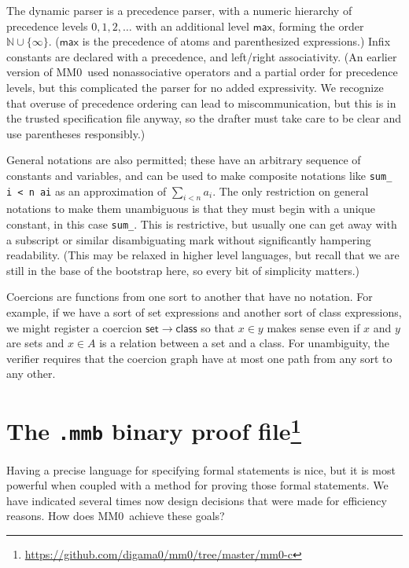 \documentclass[runningheads]{llncs}
\newcommand{\mmO}{\textsf{MM0}}
\begin{document}
The dynamic parser is a precedence parser, with a numeric hierarchy of precedence levels $0,1,2,\dots$ with an additional level $\mathsf{max}$, forming the order $\mathbb{N}\cup\{\infty\}$. ($\mathsf{max}$ is the precedence of atoms and parenthesized expressions.) Infix constants are declared with a precedence, and left/right associativity. (An earlier version of \mmO\ used nonassociative operators and a partial order for precedence levels, but this complicated the parser for no added expressivity. We recognize that overuse of precedence ordering can lead to miscommunication, but this is in the trusted specification file anyway, so the drafter must take care to be clear and use parentheses responsibly.)

General notations are also permitted; these have an arbitrary sequence of constants and variables, and can be used to make composite notations like \verb|sum_ i < n ai| as an approximation of $\sum_{i<n}a_i$. The only restriction on general notations to make them unambiguous is that they must begin with a unique constant, in this case \verb|sum_|. This is restrictive, but usually one can get away with a subscript or similar disambiguating mark without significantly hampering readability. (This may be relaxed in higher level languages, but recall that we are still in the base of the bootstrap here, so every bit of simplicity matters.)

Coercions are functions from one sort to another that have no notation. For example, if we have a sort of set expressions and another sort of class expressions, we might register a coercion $\mathsf{set}\to\mathsf{class}$ so that $x\in y$ makes sense even if $x$ and $y$ are sets and $x\in A$ is a relation between a set and a class. For unambiguity, the verifier requires that the coercion graph have at most one path from any sort to any other.

\section[The \texttt{.mmb} binary proof file]{The \texttt{.mmb} binary proof file\footnote{
  \url{https://github.com/digama0/mm0/tree/master/mm0-c}
  }}\label{sec:mmb}
Having a precise language for specifying formal statements is nice, but it is most powerful when coupled with a method for proving those formal statements. We have indicated several times now design decisions that were made for efficiency reasons. How does \mmO\ achieve these goals?
\end{document}
